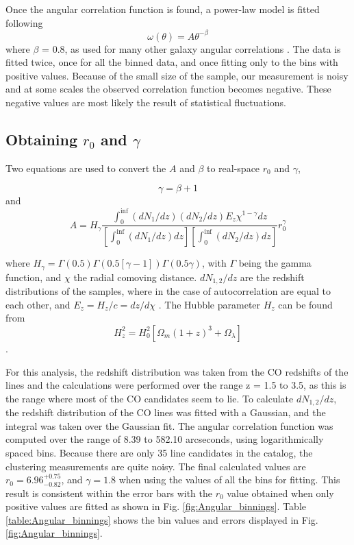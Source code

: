 Once the angular correlation function is found, a power-law model is fitted following 
\begin{equation}
    \omega(\theta) = A\theta^{-\beta} 
\end{equation} where $\beta$ = 0.8, as used for many other galaxy angular correlations \cite{hickox2011clustering}. The data is fitted twice, once for all the binned data, and once fitting only to the bins with positive values. Because of the small size of the sample, our measurement is noisy and at some scales the observed correlation function becomes negative. These negative values are most likely the result of statistical fluctuations. 

\subsection{Obtaining $r_0$ and $\gamma$}

Two equations are used to convert the $A$ and $\beta$ to real-space $r_0$ and $\gamma$, 

\begin{equation}
    \gamma = \beta + 1
\end{equation} and \begin{equation}
    A = H_{\gamma}\frac{\int_{0}^{\inf} (dN_1/dz)(dN_2/dz)E_z\chi^{1 - \gamma} dz}{[\int_{0}^{\inf} (dN_1/dz)dz][\int_{0}^{\inf} (dN_2/dz)dz]}r_0^{\gamma}
\end{equation}

where $H_{\gamma} = \Gamma(0.5)\Gamma(0.5[\gamma -1])\Gamma(0.5\gamma)$, with $\Gamma$ being the gamma function, and $\chi$ the radial comoving distance. $dN_{1,2}/dz$ are the redshift distributions of the samples, where in the case of autocorrelation are equal to each other, and $E_z = H_z/c = dz/d\chi$ \cite{hickox2011clustering}. The Hubble parameter $H_z$ can be found from
\begin{equation}
    H_z^2 = H_0^2[\Omega_m(1+z)^3 + \Omega_{\lambda}]
\end{equation}\cite{hickox2011clustering}.

For this analysis, the redshift distribution was taken from the CO redshifts of the lines and the calculations were performed over the range z = 1.5 to 3.5, as this is the range where most of the CO candidates seem to lie. To calculate $dN_{1,2}/dz$, the redshift distribution of the CO lines was fitted with a Gaussian, and the integral was taken over the Gaussian fit. The angular correlation function was computed over the range of 8.39 to 582.10 arcseconds, using logarithmically spaced bins. Because there are only 35 line candidates in the catalog, the clustering measurements are quite noisy. The final calculated values are $r_0 = 6.96_{-0.82}^{+0.75}$, and $\gamma = 1.8$ when using the values of all the bins for fitting. This result is consistent within the error bars with the $r_0$ value obtained when only positive values are fitted as shown in Fig. \ref{fig:Angular_binnings}. Table \ref{table:Angular_binnings} shows the bin values and errors displayed in Fig. \ref{fig:Angular_binnings}.


